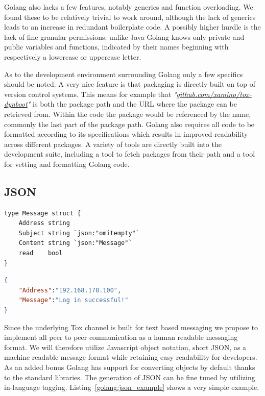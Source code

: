 Golang also lacks a few features, notably generics and function overloading.
We found these to be relatively trivial to work around, although the lack of generics leads to an increase in redundant boilerplate code.
A possibly higher hurdle is the lack of fine granular permissions: unlike Java Golang knows only private and public variables and functions, indicated by their names beginning with respectively a lowercase or uppercase letter.

As to the development environment surrounding Golang only a few specifics should be noted.
A very nice feature is that packaging is directly built on top of version control systems.
This means for example that \textit{"\href{https://github.com/xamino/tox-dynboot}{github.com/xamino/tox-dynboot}"} is both the package path and the URL where the package can be retrieved from.
Within the code the package would be referenced by the name, commonly the last part of the package path.
Golang also requires all code to be formatted according to its specifications which results in improved readability across different packages.
A variety of tools are directly built into the development suite, including a tool to fetch packages from their path and a tool for vetting and formatting Golang code.

\subsection{JSON}
\label{sub:JSON}

\begin{listing}[htp]
    \begin{lstlisting}[language=golang,firstnumber=0]
type Message struct {
    Address string
    Subject string `json:"omitempty"`
    Content string `json:"Message"`
    read    bool
}
    \end{lstlisting}
    \begin{lstlisting}[language=json,firstnumber=0]
{
    "Address":"192.168.178.100",
    "Message":"Log in successful!"
}
    \end{lstlisting}
\caption[Golang JSON Example]{
    An example Golang struct with tags and its corresponding JSON representation.
    Note that \textit{"Subject"} is missing from the JSON due to the \textit{"omitempty"} tag and \textit{"read"} due to it being private.
    Also note that \textit{"Content"} has been renamed to \textit{"Message"}.
}
\label{golang:json_example}
\end{listing}

Since the underlying Tox channel is built for text based messaging we propose to implement all peer to peer communication as a human readable messaging format.
We will therefore utilize Javascript object notation, short JSON, as a machine readable message format while retaining easy readability for developers.
As an added bonus Golang has support for converting objects by default thanks to the standard libraries.
The generation of JSON can be fine tuned by utilizing in-language tagging.
Listing~\ref{golang:json_example} shows a very simple example.

